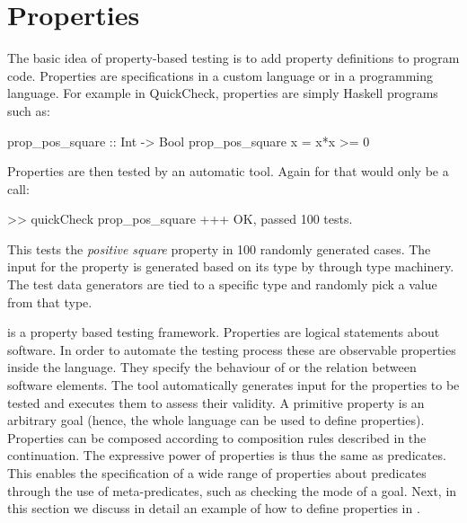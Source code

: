 

\section{\plqc{} Properties}
\label{sec:properties}

The basic idea of property-based testing is to add property definitions
to program code.
%
Properties are specifications in a custom language or in a programming
language.
%
For example in QuickCheck, properties are simply Haskell programs such as:
%
\begin{code}
 prop_pos_square :: Int -> Bool
 prop_pos_square x = x*x >= 0
\end{code}

Properties are then tested by an automatic tool.
%
Again for \Haskell \QuickCheck that would only be a call:
%
\begin{code}
 >> quickCheck prop_pos_square
 +++ OK, passed 100 tests.
\end{code}
%
This tests the \emph{positive square} property in 100 randomly
generated cases.
%
The input for the property is generated based on its type by
\QuickCheck{} through type machinery.
%
The test data generators are tied to a specific type and randomly pick a
value from that type.


\plqc{} is a property based testing framework.
%
Properties are logical statements about software.
%
In order to automate the testing process these are observable properties
inside the language.
%
They specify the behaviour of or the relation between software
elements.
%
The tool automatically generates input for the properties to be tested
and executes them to assess their validity.
%
A primitive property is an arbitrary \Prolog{} goal (hence, the whole
language can be used to define properties).
%
Properties can be composed according to composition
rules described in the continuation.
%
%
%
The expressive power of properties is thus the same as \Prolog{}
predicates.
%
This enables the specification of a wide range of properties about
predicates through the use of meta-predicates, such as checking
the mode of a goal. %
%
Next, in this section we discuss in detail an example of how to define
properties in \plqc{}.



